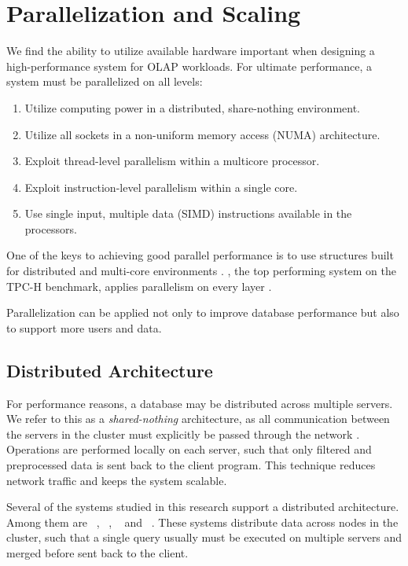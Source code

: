\chapter{Parallelization and Scaling}
\label{chap:Parallelization and Scaling}

We find the ability to utilize available hardware important when designing a high-performance system for OLAP workloads. For ultimate performance, a system must be parallelized on all levels:

\begin{enumerate}
  \item Utilize computing power in a distributed, share-nothing environment.
  \item Utilize all sockets in a non-uniform memory access (NUMA) architecture.
  \item Exploit thread-level parallelism within a multicore processor.
  \item Exploit instruction-level parallelism within a single core.
  \item Use single input, multiple data (SIMD) instructions available in the processors.
\end{enumerate}

One of the keys to achieving good parallel performance is to use structures built for distributed and multi-core environments \cite{Primsch2011-ij}. \exasol, the top performing system on the TPC-H benchmark, applies parallelism on every layer \cite{Exasol2014-xh}.

Parallelization can be applied not only to improve database performance but also to support more users and data.

\newpage

\section{Distributed Architecture}
\label{sec:Distributed Architecture}
For performance reasons, a database may be distributed across multiple servers. We refer to this as a \textit{shared-nothing} architecture, as all communication between the servers in the cluster must explicitly be passed through the network \cite{DeWitt1992-ki}. Operations are performed locally on each server,  such that only filtered and preprocessed data is sent back to the client program. This technique reduces network traffic and keeps the system scalable. 


Several of the systems studied in this research support a distributed architecture. Among them are \oracle~\cite{Mukherjee2015-ul}, \cstore~\cite{Stonebraker2005-qz}, \saph~\cite{Farber2012-vh} and \exasol~\cite{Exasol2014-xh}. These systems distribute data across nodes in the cluster, such that a single query usually must be executed on multiple servers and merged before sent back to the client.

